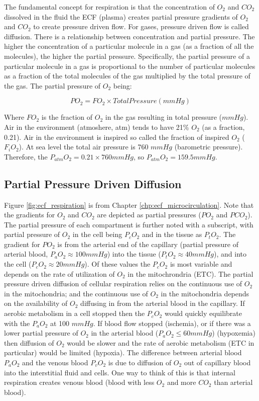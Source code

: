 The fundamental concept for respiration is that the concentration of $O_2$ and $CO_2$ dissolved in the fluid the ECF (plasma) creates partial pressure gradients of $O_2$ and $CO_2$ to create pressure driven flow. For gases, pressure driven flow is called diffusion. There is a relationship between concentration and partial pressure. The higher the concentration of a particular molecule in a gas (as a fraction of all the molecules), the higher the partial pressure. Specifically, the partial pressure of a particular molecule in a gas is proportional to the number of particular molecules as a fraction of the total molecules of the gas multiplied by the total pressure of the gas. The partial pressure of $O_2$ being:

\begin{equation}
    PO_2 = FO_2 \times Total Pressure (mmHg)
    \label{PO2}
\end{equation}

Where $FO_2$ is the fraction of $O_2$ in the gas resulting in total pressure ($mmHg$). Air in the environment (atmoshere, atm) tends to have 21\% $O_2$ (as a fraction, 0.21). Air in the environment is inspired so called the fraction of inspired $O_2$ ($F_iO_2$). At sea level the total air pressure is 760 $mmHg$ (barometric pressure). Therefore, the $P_{atm}O_2 = 0.21 \times 760 mmHg$, so $P_{atm}O_2 = 159.5 mmHg$. 

\subsection{Partial Pressure Driven Diffusion}

Figure \ref{fig:ecf_respiration} is from Chapter \ref{chp:ecf_microcirculation}. Note that the gradients for $O_2$ and $CO_2$ are depicted as partial pressures ($PO_2$ and $PCO_2$). The partial pressure of each compartment is further noted with a subscript, with partial pressure of $O_2$ in the cell being $P_cO_2$ and in the tissue as $P_tO_2$. The gradient for $PO_2$ is from the arterial end of the capillary (partial pressure of arterial blood, $P_aO_2 \approx 100 mmHg$) into the tissue ($P_tO_2 \approx 40 mmHg$), and into the cell ($P_cO_2 \approx 20 mmHg$). Of these values the $P_cO_2$ is most variable and depends on the rate of utilization of $O_2$ in the mitochrondria (ETC). The partial pressure driven diffusion of cellular respiration relies on the continuous use of $O_2$ in the mitochondria; and the continuous use of $O_2$ in the mitochondria depends on the availability of $O_2$ diffusing in from the arterial blood in the capillary. If aerobic metabolism in a cell stopped then the $P_cO_2$ would quickly equilibrate with the $P_aO_2$ at 100 $mmHg$. If blood flow stopped (ischemia), or if there was a lower partial pressure of $O_2$ in the arterial blood ($P_aO_2 \leq 60 mmHg$) (hypoxemia) then diffusion of $O_2$ would be slower and the rate of aerobic metabolism (ETC in particular) would be limited (hypoxia). 
The difference between arterial blood $P_aO_2$ and the venous blood $P_vO_2$ is due to diffusion of $O_2$ out of capillary blood into the interstitial fluid and cells. One way to think of this is that internal respiration creates venous blood (blood with less $O_2$ and more $CO_2$ than arterial blood). 

